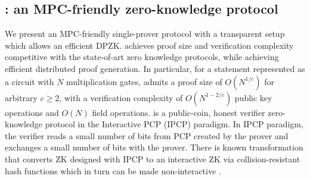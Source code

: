 \subsection{\name{}: an MPC-friendly zero-knowledge protocol}
We present an MPC-friendly single-prover protocol \name{} with a transparent setup which
allows an efficient  DPZK.
\name{} achieves proof size and verification complexity competitive with the
state-of-art zero knowledge protocols, while achieving efficient distributed
proof generation. In particular, for a statement represented as a circuit with $N$ multiplication gates,
\name{} admits a proof size of $O(N^{1/c})$ for
arbitrary $c\geq 2$, with a verification complexity of $O(N^{1-2/c})$ public key
operations and $O(N)$ field operations. \name{} is a public-coin, honest verifier
zero-knowledge protocol in the Interactive PCP (IPCP) \cite{KR08, KR09, GIMS10,ligero}
paradigm. In IPCP paradigm, the verifier reads a small number of bits from PCP created by the prover and exchanges a small number of bits with the prover.
There is known transformation that converts ZK designed with IPCP to an interactive ZK via collision-resistant hash functions \cite{IshaiMS12, IshaiW14} which in turn can be made non-interactive  \cite{FS86, BCS16}. 



%


